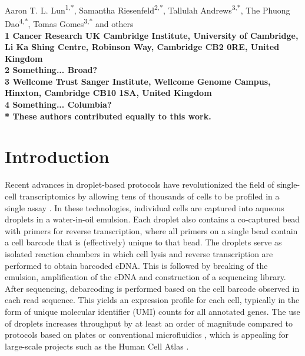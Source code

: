 \documentclass[10pt,letterpaper]{article}
\begin{document}
\vspace*{0.35in}

\begin{flushleft}
{\Large
    \textbf{}
}
\newline

Aaron T. L. Lun\textsuperscript{1,*},
Samantha Riesenfeld\textsuperscript{2,*},
Tallulah Andrews\textsuperscript{3,*},
The Phuong Dao\textsuperscript{4,*},
Tomas Gomes\textsuperscript{3,*}
and others
\\
\bigskip
\bf{1} Cancer Research UK Cambridge Institute, University of Cambridge, Li Ka Shing Centre, Robinson Way, Cambridge CB2 0RE, United Kingdom \\
\bf{2} Something... Broad? \\
\bf{3} Wellcome Trust Sanger Institute, Wellcome Genome Campus, Hinxton, Cambridge CB10 1SA, United Kingdom \\
\bf{4} Something... Columbia?
\\
\bigskip
* These authors contributed equally to this work.

\end{flushleft}

\section*{Introduction}
Recent advances in droplet-based protocols have revolutionized the field of single-cell transcriptomics by allowing tens of thousands of cells to be profiled in a single assay \cite{macosko2015highly,klein2015droplet,zheng2017massively}.
In these technologies, individual cells are captured into aqueous droplets in a water-in-oil emulsion.
Each droplet also contains a co-captured bead with primers for reverse transcription, where all primers on a single bead contain a cell barcode that is (effectively) unique to that bead.
The droplets serve as isolated reaction chambers in which cell lysis and reverse transcription are performed to obtain barcoded cDNA.
This is followed by breaking of the emulsion, amplification of the cDNA and construction of a sequencing library.
After sequencing, debarcoding is performed based on the cell barcode observed in each read sequence.
This yields an expression profile for each cell, typically in the form of unique molecular identifier (UMI) counts \cite{islam2014quantitative} for all annotated genes. 
The use of droplets increases throughput by at least an order of magnitude compared to protocols based on plates \cite{picelli2013smartseq2} or conventional microfluidics \cite{pollen2014low}, which is appealing for large-scale projects such as the Human Cell Atlas \cite{regev2017human}.
\end{document}
